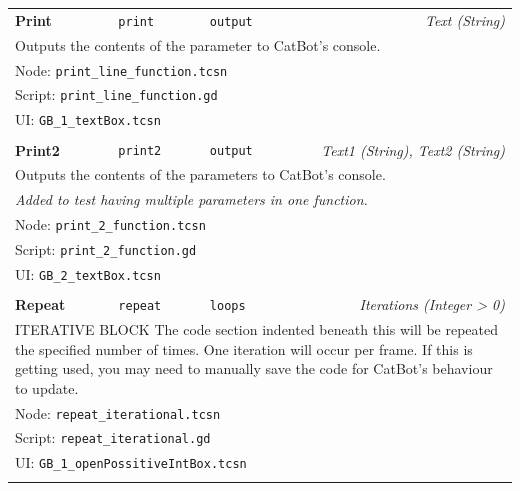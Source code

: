 \begin{center}
\begin{longtable}{lllr}
    \textbf{Print}
    & \texttt{print}
    & \texttt{output}
    & \textit{Text (String)}
    \\
    \multicolumn{4}{p{0.98\linewidth}}{
        Outputs the contents of the parameter to CatBot's console.
    }
    \\ \multicolumn{4}{l}{Node: \texttt{print\_line\_function.tcsn}}
    \\ \multicolumn{4}{l}{Script: \texttt{print\_line\_function.gd}}
    \\ \multicolumn{4}{l}{UI: \texttt{GB\_1\_textBox.tcsn}}
    \\ \\

    \textbf{Print2}
    & \texttt{print2}
    & \texttt{output}
    & \textit{Text1 (String), Text2 (String)}
    \\
    \multicolumn{4}{p{0.98\linewidth}}{
        Outputs the contents of the parameters to CatBot's console.
    }
    \\
    \multicolumn{4}{p{0.98\linewidth}}{
        \textit{Added to test having multiple parameters in one function.}
    }
    \\ \multicolumn{4}{l}{Node: \texttt{print\_2\_function.tcsn}}
    \\ \multicolumn{4}{l}{Script: \texttt{print\_2\_function.gd}}
    \\ \multicolumn{4}{l}{UI: \texttt{GB\_2\_textBox.tcsn}}
    \\ \\

    \textbf{Repeat}
    & \texttt{repeat}
    & \texttt{loops}
    & \textit{Iterations (Integer > 0)}
    \\
    \multicolumn{4}{p{0.98\linewidth}}{
        ITERATIVE BLOCK
        The code section indented beneath this will be repeated the specified number of times.
        One iteration will occur per frame.
        If this is getting used, you may need to manually save the code for CatBot's behaviour to update.
    }
    \\ \multicolumn{4}{l}{Node: \texttt{repeat\_iterational.tcsn}}
    \\ \multicolumn{4}{l}{Script: \texttt{repeat\_iterational.gd}}
    \\ \multicolumn{4}{l}{UI: \texttt{GB\_1\_openPossitiveIntBox.tcsn}}
    \\ \\


\end{longtable}
\end{center}
